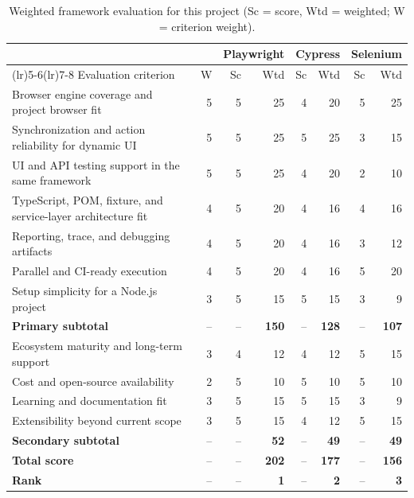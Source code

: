 \begin{table}[htbp]
  \centering
  \tablefont
  \setlength{\tabcolsep}{4pt}
  \begin{tabularx}{\textwidth}{>{\RaggedRight\arraybackslash}X r rr rr rr}
    \toprule
     & & \multicolumn{2}{c}{Playwright} & \multicolumn{2}{c}{Cypress} & \multicolumn{2}{c}{Selenium} \\
    \cmidrule(lr){3-4}\cmidrule(lr){5-6}\cmidrule(lr){7-8}
    Evaluation criterion & W & Sc & Wtd & Sc & Wtd & Sc & Wtd \\
    \midrule
    Browser engine coverage and project browser fit & 5 & 5 & 25 & 4 & 20 & 5 & 25 \\
    Synchronization and action reliability for dynamic UI & 5 & 5 & 25 & 5 & 25 & 3 & 15 \\
    UI and API testing support in the same framework & 5 & 5 & 25 & 4 & 20 & 2 & 10 \\
    TypeScript, POM, fixture, and service-layer architecture fit & 4 & 5 & 20 & 4 & 16 & 4 & 16 \\
    Reporting, trace, and debugging artifacts & 4 & 5 & 20 & 4 & 16 & 3 & 12 \\
    Parallel and CI-ready execution & 4 & 5 & 20 & 4 & 16 & 5 & 20 \\
    Setup simplicity for a Node.js project & 3 & 5 & 15 & 5 & 15 & 3 & 9 \\
    \textbf{Primary subtotal} & -- & -- & \textbf{150} & -- & \textbf{128} & -- & \textbf{107} \\
    \midrule
    Ecosystem maturity and long-term support & 3 & 4 & 12 & 4 & 12 & 5 & 15 \\
    Cost and open-source availability & 2 & 5 & 10 & 5 & 10 & 5 & 10 \\
    Learning and documentation fit & 3 & 5 & 15 & 5 & 15 & 3 & 9 \\
    Extensibility beyond current scope & 3 & 5 & 15 & 4 & 12 & 5 & 15 \\
    \textbf{Secondary subtotal} & -- & -- & \textbf{52} & -- & \textbf{49} & -- & \textbf{49} \\
    \midrule
    \textbf{Total score} & -- & -- & \textbf{202} & -- & \textbf{177} & -- & \textbf{156} \\
    \textbf{Rank} & -- & -- & \textbf{1} & -- & \textbf{2} & -- & \textbf{3} \\
    \bottomrule
  \end{tabularx}
  \caption{Weighted framework evaluation for this project (Sc = score, Wtd = weighted; W = criterion weight).}
  \label{tab:ch5-weighted-framework-evaluation}
\end{table}

